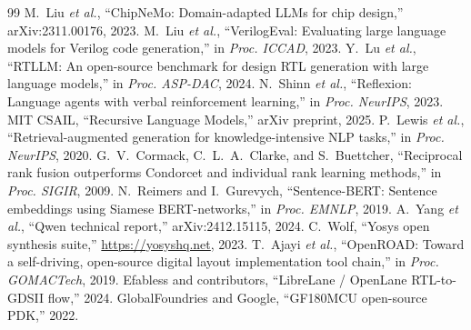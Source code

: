 \documentclass[conference]{IEEEtran}
\begin{document}
\begin{thebibliography}{99}
 M.~Liu \textit{et al.}, ``ChipNeMo: Domain-adapted LLMs for
chip design,'' arXiv:2311.00176, 2023.
 M.~Liu \textit{et al.}, ``VerilogEval: Evaluating large
language models for Verilog code generation,'' in \textit{Proc. ICCAD}, 2023.
 Y.~Lu \textit{et al.}, ``RTLLM: An open-source benchmark for
design RTL generation with large language models,'' in \textit{Proc. ASP-DAC},
2024.
 N.~Shinn \textit{et al.}, ``Reflexion: Language agents with
verbal reinforcement learning,'' in \textit{Proc. NeurIPS}, 2023.
 MIT CSAIL, ``Recursive Language Models,'' arXiv preprint, 2025.
 P.~Lewis \textit{et al.}, ``Retrieval-augmented generation for
knowledge-intensive NLP tasks,'' in \textit{Proc. NeurIPS}, 2020.
 G.~V.~Cormack, C.~L.~A.~Clarke, and S.~Buettcher, ``Reciprocal
rank fusion outperforms Condorcet and individual rank learning methods,'' in
\textit{Proc. SIGIR}, 2009.
 N.~Reimers and I.~Gurevych, ``Sentence-BERT: Sentence embeddings
using Siamese BERT-networks,'' in \textit{Proc. EMNLP}, 2019.
 A.~Yang \textit{et al.}, ``Qwen technical report,''
arXiv:2412.15115, 2024.
 C.~Wolf, ``Yosys open synthesis suite,''
\url{https://yosyshq.net}, 2023.
 T.~Ajayi \textit{et al.}, ``OpenROAD: Toward a self-driving,
open-source digital layout implementation tool chain,'' in \textit{Proc.
GOMACTech}, 2019.
 Efabless and contributors, ``LibreLane / OpenLane
RTL-to-GDSII flow,'' 2024.
 GlobalFoundries and Google, ``GF180MCU open-source PDK,'' 2022.
\end{thebibliography}
\end{document}
